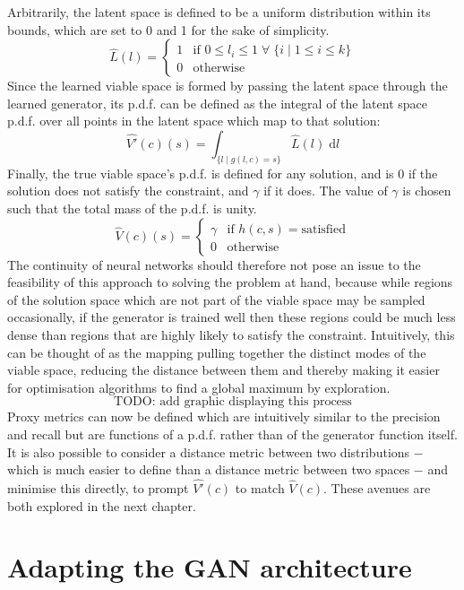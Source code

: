 \documentclass[../../main.tex]{subfiles}
\begin{document}
Arbitrarily, the latent space is defined to be a uniform distribution within its bounds, which are set to 0 and 1 for the sake of simplicity.
$$\hat{L}(l)=\left\{\begin{array}{ll}1&\mbox{if }0\le l_i\le1\;\forall\;\{i\;|\;1\le i\le k\}\\0&\mbox{otherwise}\end{array}\right.$$
Since the learned viable space is formed by passing the latent space through the learned generator, its p.d.f. can be defined as the integral of the latent space p.d.f. over all points in the latent space which map to that solution:
$$\hat{V'}(c)(s)=\int_{\{l\;|\;g(l,c)=s\}}\hat{L}(l)\;\mathrm{d}l$$
Finally, the true viable space's p.d.f. is defined for any solution, and is $0$ if the solution does not satisfy the constraint, and $\gamma$ if it does.
The value of $\gamma$ is chosen such that the total mass of the p.d.f. is unity.
$$\hat{V}(c)(s)=\left\{\begin{array}{ll}\gamma&\mbox{if }h(c,s)=\text{satisfied}\\0&\mbox{otherwise}\end{array}\right.$$
The continuity of neural networks should therefore not pose an issue to the feasibility of this approach to solving the problem at hand, because while regions of the solution space which are not part of the viable space may be sampled occasionally, if the generator is trained well then these regions could be much less dense than regions that are highly likely to satisfy the constraint.
Intuitively, this can be thought of as the mapping pulling together the distinct modes of the viable space, reducing the distance between them and thereby making it easier for optimisation algorithms to find a global maximum by exploration.
$$\text{TODO: add graphic displaying this process}$$
Proxy metrics can now be defined which are intuitively similar to the precision and recall but are functions of a p.d.f. rather than of the generator function itself.
It is also possible to consider a distance metric between two distributions $-$ which is much easier to define than a distance metric between two spaces $-$ and minimise this directly, to prompt $\hat{V'}(c)$ to match $\hat{V}(c)$.
These avenues are both explored in the next chapter.

\section{Adapting the GAN architecture} \label{section:adaptingTheGANArchitecture}
\end{document}
